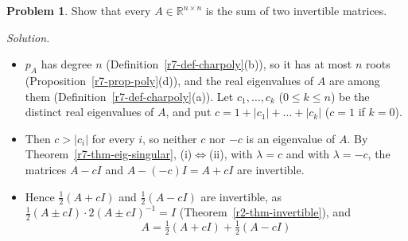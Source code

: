 \documentclass[12pt]{article}
\newcommand{\R}{\mathbb R}
\theoremstyle{definition}
\newtheorem{problem}{Problem}
\newenvironment{solution}{\par\noindent\textit{Solution.}\ }{\par\smallskip}
\begin{document}
\begin{problem}\label{r7-ex-pr-two-invertible}
Show that every \(A\in\R^{n\times n}\) is the sum of two invertible matrices.
\end{problem}
\begin{solution}
\begin{itemize}
\item \(p_A\) has degree \(n\) (Definition~\ref{r7-def-charpoly}(b)), so it has at most \(n\) roots
(Proposition~\ref{r7-prop-poly}(d)), and the real eigenvalues of \(A\) are among them
(Definition~\ref{r7-def-charpoly}(a)). Let \(c_1,\dots,c_k\) (\(0\leqslant k\leqslant n\)) be the distinct real
eigenvalues of \(A\), and put \(c=1+\lvert c_1\rvert+\dots+\lvert c_k\rvert\) (\(c=1\) if \(k=0\)).
\item Then \(c>\lvert c_i\rvert\) for every \(i\), so neither \(c\) nor \(-c\) is an eigenvalue of \(A\). By
Theorem~\ref{r7-thm-eig-singular}, (i)\(\Leftrightarrow\)(ii), with \(\lambda=c\) and with \(\lambda=-c\), the matrices
\(A-cI\) and \(A-(-c)I=A+cI\) are invertible.
\item Hence \(\frac12(A+cI)\) and \(\frac12(A-cI)\) are invertible, as
\(\frac12(A\pm cI)\cdot2(A\pm cI)^{-1}=I\) (Theorem~\ref{r2-thm-invertible}), and
\[
A=\tfrac12(A+cI)+\tfrac12(A-cI)
\]
\end{itemize}
\end{solution}
\end{document}
